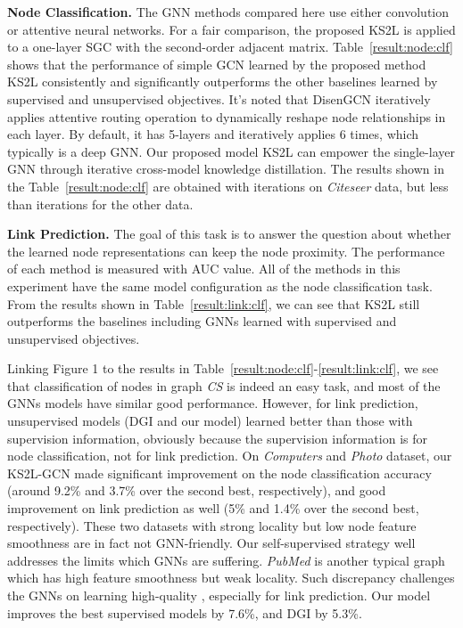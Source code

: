 \documentclass[preprint]{article}
\begin{document}
\textbf{Node Classification.} The GNN methods compared here use either convolution or attentive neural networks. For a fair comparison, the proposed KS2L is applied to a one-layer SGC with the second-order adjacent matrix. Table~\ref{result:node:clf} shows that the performance of simple GCN learned by the proposed method KS2L consistently and significantly outperforms the other baselines learned by supervised and unsupervised objectives. It's noted that DisenGCN iteratively applies attentive routing operation to dynamically reshape node relationships in each layer. By default, it has 5-layers and iteratively applies 6 times, which typically is a deep GNN. Our proposed model KS2L can empower the single-layer GNN through iterative cross-model knowledge distillation. The results shown in the Table~\ref{result:node:clf} are obtained with  iterations on  \emph{Citeseer} data, but less than  iterations for the other data.

\textbf{Link Prediction.} The goal of this task is to answer the question about whether the learned node representations can keep the node proximity. The performance of each method is measured with AUC value. All of the methods in this experiment have the same model configuration as the node classification task. From the results shown in Table~\ref{result:link:clf}, we can see that KS2L still outperforms the baselines including GNNs learned with supervised and unsupervised objectives.

Linking Figure 1 to the results in Table~\ref{result:node:clf}-\ref{result:link:clf}, we see that classification of nodes in graph  \emph{CS} is indeed an easy task, and most of the GNNs models have similar good performance. However, for link prediction, unsupervised models (DGI and our model) learned better  than those with supervision information, obviously because the supervision information is for node classification, not for link prediction.  On  \emph{Computers} and \emph{Photo} dataset, our KS2L-GCN made significant improvement on the node classification accuracy (around 9.2\% and 3.7\% over the second best, respectively), and good improvement on link prediction as well (5\% and 1.4\% over the second best, respectively). These two datasets with strong locality but low node feature smoothness are in fact not GNN-friendly. Our self-supervised strategy well addresses the limits which GNNs are suffering.  \emph{PubMed} is another typical graph which has high feature smoothness but weak locality. Such discrepancy challenges the GNNs on learning high-quality , especially for link prediction. Our model improves the best supervised models by 7.6\%,  and DGI by 5.3\%.   
\end{document}

